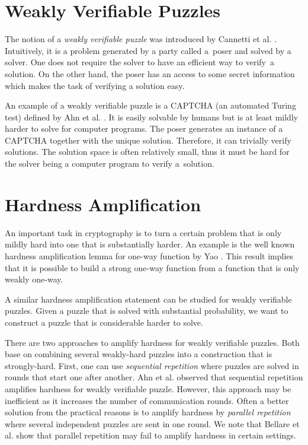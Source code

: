 \section{Weakly Verifiable Puzzles}
The notion of a \textit{weakly verifiable puzzle} was introduced by Cannetti et al. \cite{canetti2005hardness}.
Intuitively, it is a problem generated by a party called a~poser
and solved by a solver. One does not require the solver to have an efficient way to verify~a solution.
On the other hand, the poser has an access to some secret information which makes the task of verifying a solution easy.

An example of a weakly verifiable puzzle is a CAPTCHA (an automated Turing test) defined by Ahn et al. \cite{von2003captcha}.
It is easily solvable by humans but is at least mildly harder to solve for computer programs.
The poser generates an instance of a CAPTCHA together with the unique solution.
Therefore, it can trivially verify solutions.
The solution space is often relatively small,
thus it must be hard for the solver being a computer program to verify a~solution.

\section{Hardness Amplification}
An important task in cryptography is to turn a certain problem that is only mildly hard into one that is substantially harder.
An example is the well known hardness amplification lemma for one-way function by Yao \cite{yao1982theory}.
This result implies that it is possible to build a strong one-way function from a function that is only weakly one-way.

A similar hardness amplification statement can be studied for weakly verifiable puzzles.
Given a puzzle that is solved with substantial probability, we want to construct a puzzle that is considerable harder to solve.

There are two approaches to amplify hardness for weakly verifiable puzzles.
Both base on combining several weakly-hard puzzles into a construction that is strongly-hard.
First, one can use \textit{sequential repetition} where puzzles are solved in rounds that start one after another.
Ahn et al. \cite{von2003captcha} observed that sequential repetition amplifies hardness for weakly verifiable puzzle.
However, this approach may be inefficient as it increases the number of communication rounds.
Often a better solution from the practical reasons is to amplify hardness by \textit{parallel repetition}
where several independent puzzles are sent in one round.
We note that Bellare et al. \cite{bellare1997does} show that parallel repetition may fail to amplify hardness in certain settings.

